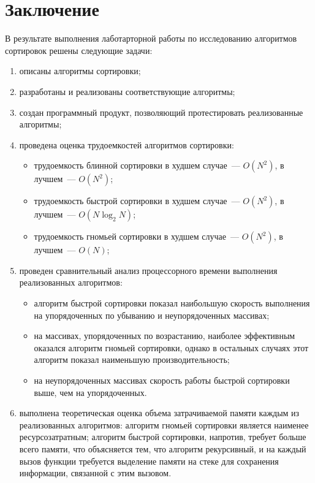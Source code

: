 \chapter*{Заключение}

В результате выполнения лаботарторной работы по исследованию алгоритмов сортировок решены следующие задачи:
\begin{enumerate}
    \item описаны алгоритмы сортировки;
    \item разработаны и реализованы соответствующие алгоритмы;
    \item создан программный продукт, позволяющий протестировать реализованные алгоритмы;
    \item проведена оценка трудоемкостей алгоритмов сортировки:
    \begin{itemize}
        \item трудоемкость блинной сортировки в худшем случае~--- $O(N^2)$, в лучшем~--- $O(N^2)$;
        \item трудоемкость быстрой сортировки в худшем случае~--- $O(N^2)$, в лучшем~--- $O(N\log_2{N})$;
        \item трудоемкость гномьей сортировки в худшем случае~--- $O(N^2)$, в лучшем~--- $O(N)$;
    \end{itemize}
    \item проведен сравнительный анализ процессорного времени выполнения реализованных алгоритмов:
    \begin{itemize}
        \item алгоритм быстрой сортировки показал наибольшую скорость выполнения на упорядоченных по убыванию и неупорядоченных массивах;
        \item на массивах, упорядоченных по возрастанию, наиболее эффективным оказался алгоритм гномьей сортировки, однако в остальных случаях этот алгоритм показал наименьшую производительность;
        \item на неупорядоченных массивах скорость работы быстрой сортировки выше, чем на упорядоченных.
    \end{itemize}
    \item выполнена теоретическая оценка объема затрачиваемой памяти каждым из реализованных алгоритмов: алгоритм гномьей сортировки является наименее ресурсозатратным;
    алгоритм быстрой сортировки, напротив, требует больше всего памяти, что объясняется тем, что алгоритм рекурсивный, и на каждый вызов функции требуется выделение памяти на стеке для сохранения информации, связанной с этим вызовом.
\end{enumerate}
